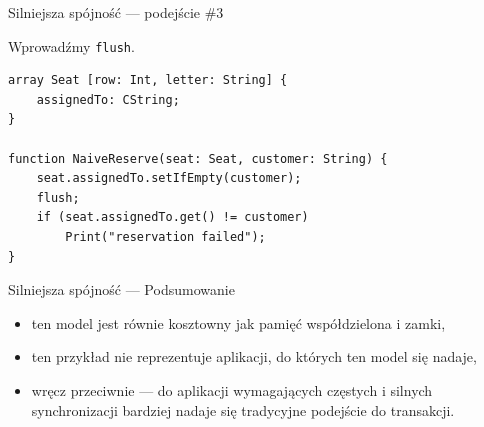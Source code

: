 \documentclass{beamer}
\begin{document}
\begin{frame}[fragile]{Silniejsza spójność --- podejście \#3}
    \begin{card}
        Wprowadźmy \texttt{flush}.
    \end{card}
    \begin{card}
        \begin{lstlisting}
array Seat [row: Int, letter: String] {
    assignedTo: CString;
}

function NaiveReserve(seat: Seat, customer: String) {
    seat.assignedTo.setIfEmpty(customer);
    flush;
    if (seat.assignedTo.get() != customer)
        Print("reservation failed");
}
        \end{lstlisting}
    \end{card}
\end{frame}

\begin{frame}[fragile]{Silniejsza spójność --- Podsumowanie}
    \begin{card}
        \begin{itemize}[<+->]
            \item ten model jest równie kosztowny jak pamięć współdzielona i zamki,
            \item ten przykład nie reprezentuje aplikacji, do których ten model się nadaje,
            \item wręcz przeciwnie --- do aplikacji wymagających częstych i silnych synchronizacji bardziej nadaje się tradycyjne podejście do transakcji.
        \end{itemize}
    \end{card}
\end{frame}
\end{document}
